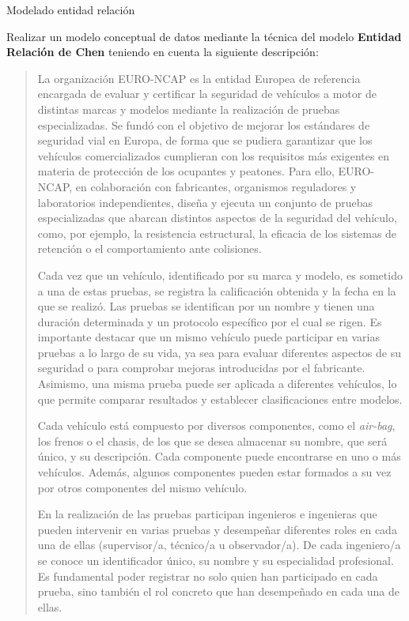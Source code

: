 \documentclass[
    12pt,
    a4paper,
    addpoints,
    answers,
    convocatoria=ext,
    titulacion=NoCD,
    curso=2024/2025,
]{db-exam}
\begin{document}
\begin{questions}

\question[2\half] Modelado entidad relación

Realizar un modelo conceptual de datos mediante la técnica del modelo \textbf{Entidad Relación de Chen} teniendo en cuenta la siguiente descripción:

\begin{quotation}
La organización EURO-NCAP es la entidad Europea de referencia encargada de evaluar y certificar la seguridad de vehículos a motor de distintas marcas y modelos mediante la realización de pruebas especializadas. Se fundó con el objetivo de mejorar los estándares de seguridad vial en Europa, de forma que se pudiera garantizar que los vehículos comercializados cumplieran con los requisitos más exigentes en materia de protección de los ocupantes y peatones. Para ello, EURO-NCAP, en colaboración con fabricantes, organismos reguladores y laboratorios independientes, diseña y ejecuta un conjunto de pruebas especializadas que abarcan distintos aspectos de la seguridad del vehículo, como, por ejemplo, la resistencia estructural, la eficacia de los sistemas de retención o el comportamiento ante colisiones.

Cada vez que un vehículo, identificado por su marca y modelo, es sometido a una de estas pruebas, se registra la calificación obtenida y la fecha en la que se realizó. Las pruebas se identifican por un nombre y tienen una duración determinada y un protocolo específico por el cual se rigen. Es importante destacar que un mismo vehículo puede participar en varias pruebas a lo largo de su vida, ya sea para evaluar diferentes aspectos de su seguridad o para comprobar mejoras introducidas por el fabricante. Asimismo, una misma prueba puede ser aplicada a diferentes vehículos, lo que permite comparar resultados y establecer clasificaciones entre modelos.

Cada vehículo está compuesto por diversos componentes, como el \textit{air-bag}, los frenos o el chasis, de los que se desea almacenar su nombre, que será único, y su descripción. Cada componente puede encontrarse en uno o más vehículos. Además, algunos componentes pueden estar formados a su vez por otros componentes del mismo vehículo.

En la realización de las pruebas participan ingenieros e ingenieras que pueden intervenir en varias pruebas y desempeñar diferentes roles en cada una de ellas (supervisor/a, técnico/a u observador/a). De cada ingeniero/a se conoce un identificador único, su nombre y su especialidad profesional. Es fundamental poder registrar no solo quien han participado en cada prueba, sino también el rol concreto que han desempeñado en cada una de ellas.


\end{quotation}
\end{questions}
\end{document}
